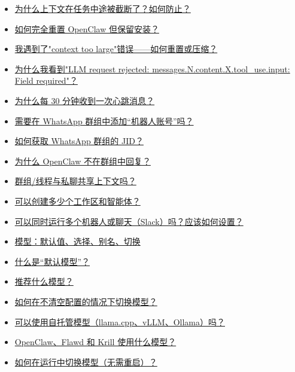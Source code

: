 \begin{itemize}
  \item \href{\#why-did-context-get-truncated-midtask-how-do-i-prevent-it}{为什么上下文在任务中途被截断了？如何防止？}
  \item \href{\#how-do-i-completely-reset-openclaw-but-keep-it-installed}{如何完全重置 OpenClaw 但保留安装？}
  \item \href{\#im-getting-context-too-large-errors-how-do-i-reset-or-compact}{我遇到了"context too large"错误——如何重置或压缩？}
  \item \href{\#why-am-i-seeing-llm-request-rejected-messagesncontentxtooluseinput-field-required}{为什么我看到"LLM request rejected: messages.N.content.X.tool\_use.input: Field required"？}
  \item \href{\#why-am-i-getting-heartbeat-messages-every-30-minutes}{为什么每 30 分钟收到一次心跳消息？}
  \item \href{\#do-i-need-to-add-a-bot-account-to-a-whatsapp-group}{需要在 WhatsApp 群组中添加“机器人账号”吗？}
  \item \href{\#how-do-i-get-the-jid-of-a-whatsapp-group}{如何获取 WhatsApp 群组的 JID？}
  \item \href{\#why-doesnt-openclaw-reply-in-a-group}{为什么 OpenClaw 不在群组中回复？}
  \item \href{\#do-groupsthreads-share-context-with-dms}{群组/线程与私聊共享上下文吗？}
  \item \href{\#how-many-workspaces-and-agents-can-i-create}{可以创建多少个工作区和智能体？}
  \item \href{\#can-i-run-multiple-bots-or-chats-at-the-same-time-slack-and-how-should-i-set-that-up}{可以同时运行多个机器人或聊天（Slack）吗？应该如何设置？}
  \item \href{\#models-defaults-selection-aliases-switching}{模型：默认值、选择、别名、切换}
  \item \href{\#what-is-the-default-model}{什么是“默认模型”？}
  \item \href{\#what-model-do-you-recommend}{推荐什么模型？}
  \item \href{\#how-do-i-switch-models-without-wiping-my-config}{如何在不清空配置的情况下切换模型？}
  \item \href{\#can-i-use-selfhosted-models-llamacpp-vllm-ollama}{可以使用自托管模型（llama.cpp、vLLM、Ollama）吗？}
  \item \href{\#what-do-openclaw-flawd-and-krill-use-for-models}{OpenClaw、Flawd 和 Krill 使用什么模型？}
  \item \href{\#how-do-i-switch-models-on-the-fly-without-restarting}{如何在运行中切换模型（无需重启）？}

\end{itemize}
